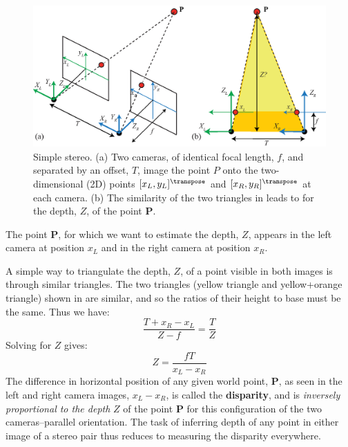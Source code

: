 \begin{figure}
    \centerline{
        \includegraphics[width=1\linewidth]{figures/3d_scene_understanding/triangularization_stereo.eps}
    }
    \caption{Simple stereo. (a) Two cameras, of identical focal length, $f$, and separated by an offset, $T$, image the point $P$ onto the two-dimensional (2D) points $[x_L,y_L]^\transpose$ and $[x_R,y_R]^\transpose$ at each camera.  (b) The similarity of the two triangles in leads to \eqn{\ref{eq:depthFromDisparity}} for the depth, $Z$, of the point $\mathbf{P}$.}
    \label{fig:stereo}
\end{figure}

The point $\mathbf{P}$, for which we want to estimate the depth, $Z$, appears in the left camera at position $x_L$ and in the right camera at position $x_R$.



A simple way to triangulate the depth, $Z$, of a point visible in both images is through similar triangles.  The two triangles (yellow triangle and yellow+orange triangle) shown in  are similar, and so the ratios of their height to base must be the same.  Thus we have:
\begin{equation}
    \frac{T+x_R-x_L}{Z-f} = \frac{T}{Z}
\end{equation}
Solving for $Z$ gives:
\begin{equation}
    Z =  \frac{fT}{x_L-x_R}
    \label{eq:depthFromDisparity}
\end{equation}
The difference in horizontal position of any given world point, $\mathbf{P}$, as seen in the left and right camera images, $x_L - x_R$, is called the {\bf disparity},
and is {\em inversely proportional to the depth} $Z$ of the point $\mathbf{P}$ for this configuration of the two cameras--parallel orientation.  The task of inferring depth of any point in either image of a stereo pair thus reduces to measuring the disparity everywhere.

